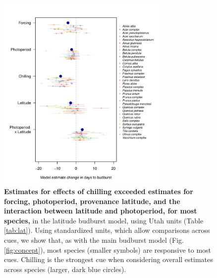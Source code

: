 \documentclass{article}
\begin{document}
\begin{figure}[h!]
\centering
\noindent \includegraphics[width=0.75\textwidth]{..//..//analyses/lat_analysis/figures/latanalysis_spcom_expramp_fp.pdf}
\caption{\textbf{Estimates for effects of chilling exceeded estimates for forcing, photoperiod, provenance latitude, and the interaction between latitude and photoperiod, for most species,} in the latitude budburst model, using Utah units (Table \ref{tab:lat}). Using standardized units, which allow comparisons across cues, we show that, as with the main budburst model (Fig. \ref{fig:concept}), most species (smaller symbols) are responsive to most cues. Chilling is the strongest cue when considering overall estimates across species (larger, dark blue circles).}
\label{fig:lat}
\end{figure}
\end{document}

